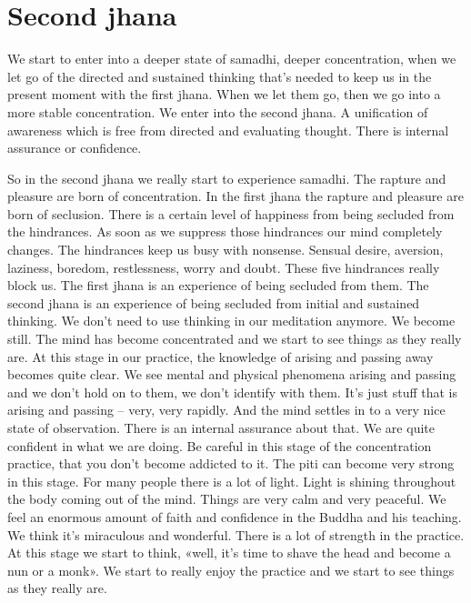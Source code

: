 \documentclass[letterpaper,10pt,english]{sphinxmanual}
\begin{document}
\section{Second jhana}
\label{\detokenize{6-a:second-jhana}}
\sphinxAtStartPar
{} We start to enter into a deeper state of samadhi, deeper concentration,
when we let go of the directed and sustained thinking that’s needed to keep
us in the present moment with the first jhana. When we let them go, then we
go into a more stable concentration. We enter into the second jhana.
A unification of awareness which is free from directed and
evaluating thought. There is internal assurance or confidence.

\sphinxAtStartPar
So in the second jhana we really start to experience samadhi. The rapture  and  pleasure  are  born  of  concentration.  In  the  first  jhana  the  rapture
and  pleasure  are  born  of  seclusion.  There  is  a  certain  level  of  happiness
from  being  secluded  from  the  hindrances.  As  soon  as  we  suppress  those
hindrances our mind completely changes. The hindrances keep us busy with
non\sphinxhyphen{}sense. Sensual desire, aversion, laziness, boredom, restlessness, worry
and doubt. These five hindrances really block us. The first jhana is an experience of being secluded from them. The second jhana is an experience of
being  secluded  from  initial  and  sustained  thinking.  We  don’t  need  to  use
thinking in our meditation anymore. We become still. The mind has become
concentrated and we start to see things as they really are. At this stage in our
practice,  the  knowledge  of  arising  and  passing  away  becomes  quite  clear.
We  see  mental  and  physical  phenomena  arising  and  passing  and  we  don’t
hold on to them, we don’t identify with them. It’s just stuff that is arising and
passing – very, very rapidly. And the mind settles in to a very nice state of
observation. There is an internal assurance about that. We are quite confident
in what we are doing. Be careful in this stage of the concentration practice,
that you don’t become addicted to it. The piti can become very strong in this
stage.  For  many  people  there  is  a  lot  of  light.  Light  is  shining  throughout
the body coming out of the mind. Things are very calm and very peaceful.
We feel an enormous amount of faith and confidence in the Buddha and his
teaching. We think it’s miraculous and wonderful. There is a lot of strength
  in the practice. At this stage we start to think, «well, it’s time to shave the
head and become a nun or a monk». We start to really enjoy the practice and
we start to see things as they really are.
\end{document}
